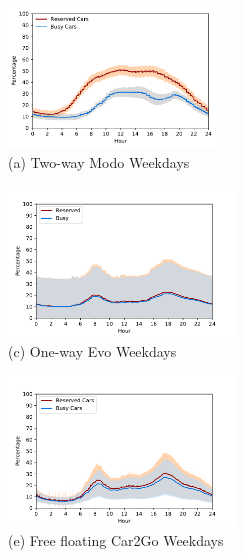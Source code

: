 \begin{figure}
\centering
   \begin{minipage}[b]{0.45\linewidth}
   \centering      
         \begin{minipage}[b]{\linewidth}
           \hspace*{-0.9cm}
           \centering
           \includegraphics[width=55mm]{modo_inTravel/weekdays.pdf}
           {\\(a) Two-way Modo Weekdays}
         \end{minipage}
         \begin{minipage}[b]{\linewidth}
           \centering
           \hspace*{-0.6cm}
           \includegraphics[width=60mm]{evo_inTravel/weekdayslim.pdf}
           {\\(c) One-way Evo Weekdays}
         \end{minipage}
         \begin{minipage}[b]{\linewidth}
           \centering
           \hspace*{-0.6cm}
           \includegraphics[width=60mm]{car2go_inTravel/weekdayslim.pdf}
           {\\(e) Free floating Car2Go Weekdays}
         \end{minipage}

\end{minipage}
\end{figure}
